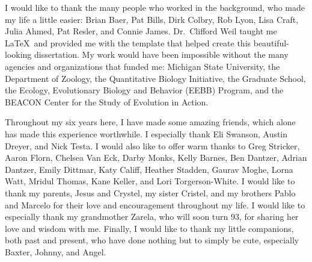 \begin{acknowledgment}
I would like to thank the many people who worked in the background,
who made my life a little easier: Brian Baer, Pat Bills, Dirk Colbry, Rob Lyon,
Lisa Craft, Julia Ahmed, Pat Resler, and Connie James.
%
Dr.\ Clifford Weil taught me \LaTeX\ and provided me with the template that
helped create this beautiful-looking dissertation.
%
My work would have been impossible without the many agencies and organizations
that funded me: Michigan State University, the Department of Zoology,
the Quantitative Biology Initiative, the Graduate School,
the Ecology, Evolutionary Biology and Behavior (EEBB) Program,
and the BEACON Center for the Study of Evolution in Action.



Throughout my six years here, I have made some amazing friends,
which alone has made this experience worthwhile.
%
I especially thank Eli Swanson, Austin Dreyer, and Nick Testa.
%
I would also like to offer warm thanks to Greg Stricker, Aaron Florn,
Chelsea Van Eck, Darby Monks, Kelly Barnes, Ben Dantzer, Adrian Dantzer,
Emily Dittmar, Katy Califf, Heather Stadden, Gaurav Moghe, Lorna Watt,
Mridul Thomas, Kane Keller, and Lori Torgerson-White.
%
I would like to thank my parents, Jesus and Crystel,
my sister Cristel, and my brothers Pablo and Marcelo
for their love and encouragement throughout my life.
%
I would like to especially thank my grandmother Zarela,
who will soon turn 93, for sharing her love and wisdom with me.
%
Finally, I would like to thank my little companions,
both past and present, who have done nothing but to simply be cute,
especially Baxter, Johnny, and Angel.

\end{acknowledgment}

